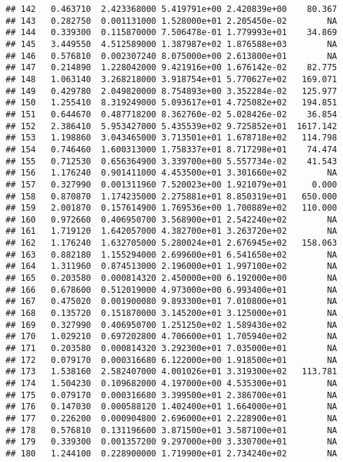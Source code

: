 \documentclass[
]{article}
\begin{document}
\begin{verbatim}
## 142   0.463710  2.423368000 5.419791e+00 2.420839e+00    80.367
## 143   0.282750  0.001131000 1.528000e+01 2.205450e-02        NA
## 144   0.339300  0.115870000 7.506478e-01 1.779993e+01    34.869
## 145   3.449550  4.512589000 1.387987e+02 1.876588e+03        NA
## 146   0.576810  0.002307240 8.075000e+00 2.613800e+01        NA
## 147   0.214890  1.228042000 9.421916e+00 1.676142e-02    82.775
## 148   1.063140  3.268218000 3.918754e+01 5.770627e+02   169.071
## 149   0.429780  2.049820000 8.754893e+00 3.352284e-02   125.977
## 150   1.255410  8.319249000 5.093617e+01 4.725082e+02   194.851
## 151   0.644670  0.487718200 8.362760e-02 5.028426e-02    36.854
## 152   2.386410  5.953427000 5.435539e+02 9.725852e+01  1617.142
## 153   1.198860  3.043465000 3.713501e+01 1.678718e+02   114.798
## 154   0.746460  1.600313000 1.758337e+01 8.717298e+01    74.474
## 155   0.712530  0.656364900 3.339700e+00 5.557734e-02    41.543
## 156   1.176240  0.901411000 4.453500e+01 3.301660e+02        NA
## 157   0.327990  0.001311960 7.520023e+00 1.921079e+01     0.000
## 158   0.870870  1.174235000 2.275881e+01 8.850319e+01   650.000
## 159   2.001870  0.157614900 1.769536e+00 1.700889e+02   110.000
## 160   0.972660  0.406950700 3.568900e+01 2.542240e+02        NA
## 161   1.719120  1.642057000 4.382700e+01 3.263720e+02        NA
## 162   1.176240  1.632705000 5.280024e+01 2.676945e+02   158.063
## 163   0.882180  1.155294000 2.699600e+01 6.541650e+02        NA
## 164   1.311960  0.874513000 2.196000e+01 1.997100e+02        NA
## 165   0.203580  0.000814320 2.450000e+00 6.192000e+00        NA
## 166   0.678600  0.512019000 4.973000e+00 6.993400e+01        NA
## 167   0.475020  0.001900080 9.893300e+01 7.010800e+01        NA
## 168   0.135720  0.151870000 3.145200e+01 3.125000e+01        NA
## 169   0.327990  0.406950700 1.251250e+02 1.589430e+02        NA
## 170   1.029210  0.697202800 4.706600e+01 1.705940e+02        NA
## 171   0.203580  0.000814320 3.292300e+01 7.035000e+01        NA
## 172   0.079170  0.000316680 6.122000e+00 1.918500e+01        NA
## 173   1.538160  2.582407000 4.001026e+01 3.319300e+02   113.781
## 174   1.504230  0.109682000 4.197000e+00 4.535300e+01        NA
## 175   0.079170  0.000316680 3.399500e+01 2.386700e+01        NA
## 176   0.147030  0.000588120 1.402400e+01 1.664000e+01        NA
## 177   0.226200  0.000904800 2.696000e+01 2.228900e+01        NA
## 178   0.576810  0.131196600 3.871500e+01 3.587100e+01        NA
## 179   0.339300  0.001357200 9.297000e+00 3.330700e+01        NA
## 180   1.244100  0.228900000 1.719900e+01 2.734240e+02        NA

\end{verbatim}
\end{document}
